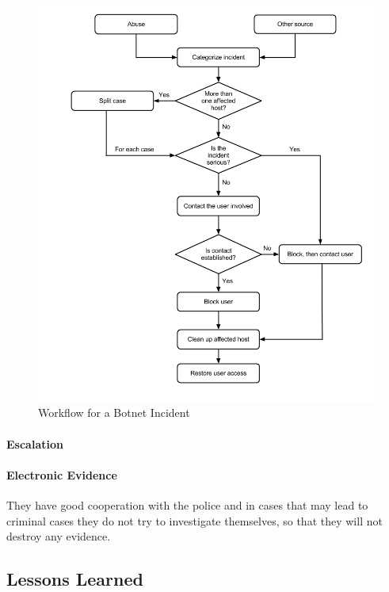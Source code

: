 \begin{figure}[H]
\hspace{-1.1cm}\includegraphics[scale=0.53]{WorkflowCaseABotnet.png}
\caption[Workflow for a Botnet Incident, Case B]{Workflow for a Botnet Incident}
\label{fig:WorkflowCaseABotnet}
\end{figure}

\paragraph{Escalation}

\paragraph{Electronic Evidence}
They have good cooperation with the police and in cases that may lead to criminal cases they do not try to investigate themselves, so that they will not destroy any evidence. %

\subsection{Lessons Learned}
